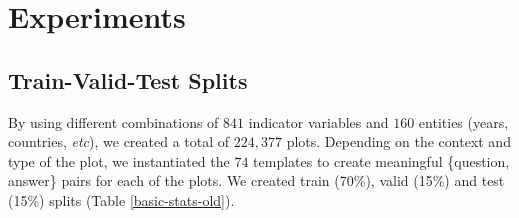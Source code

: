 \documentclass[10pt,twocolumn,letterpaper]{article}
\begin{document}


\section{Experiments}
\label{sec:experiments}

\subsection{Train-Valid-Test Splits} 
By using different combinations of $841$ indicator variables and $160$ entities (years, countries, \textit{etc}), we created a total of $224,377$ plots. 
Depending on the context and type of the plot, we instantiated the $74$ templates to create meaningful \{question, answer\} pairs for each of the plots. 
We created train (70\%), valid (15\%) and test (15\%) splits (Table \ref{basic-stats-old}). 
\end{document}
